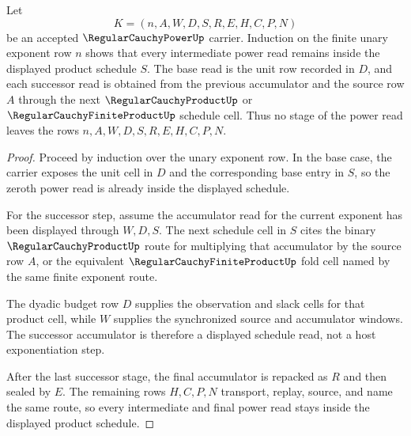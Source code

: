 \begin{theorem}\label{thm:regular-cauchy-power-product-induction}
Let
$$
K=(n,A,W,D,S,R,E,H,C,P,N)
$$
be an accepted $\RegularCauchyPowerUp$ carrier. Induction on the finite unary exponent row $n$ shows that every intermediate power read remains inside the displayed product schedule $S$. The base read is the unit row recorded in $D$, and each successor read is obtained from the previous accumulator and the source row $A$ through the next $\RegularCauchyProductUp$ or $\RegularCauchyFiniteProductUp$ schedule cell. Thus no stage of the power read leaves the rows $n,A,W,D,S,R,E,H,C,P,N$.
\end{theorem}
\begin{proof}
Proceed by induction over the unary exponent row. In the base case, the carrier exposes the unit cell in $D$ and the corresponding base entry in $S$, so the zeroth power read is already inside the displayed schedule.

For the successor step, assume the accumulator read for the current exponent has been displayed through $W,D,S$. The next schedule cell in $S$ cites the binary $\RegularCauchyProductUp$ route for multiplying that accumulator by the source row $A$, or the equivalent $\RegularCauchyFiniteProductUp$ fold cell named by the same finite exponent route.

The dyadic budget row $D$ supplies the observation and slack cells for that product cell, while $W$ supplies the synchronized source and accumulator windows. The successor accumulator is therefore a displayed schedule read, not a host exponentiation step.

After the last successor stage, the final accumulator is repacked as $R$ and then sealed by $E$. The remaining rows $H,C,P,N$ transport, replay, source, and name the same route, so every intermediate and final power read stays inside the displayed product schedule.
\end{proof}



